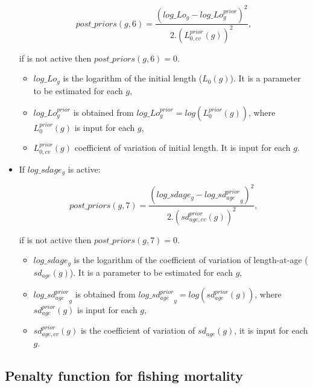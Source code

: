 \documentclass{article}
\begin{document}
\begin{itemize}
        \begin{equation}
            post\_priors(g,6) = \dfrac{(log\_Lo_g-log\_Lo^{prior}_{g})^2}{2.(L_{0,cv}^{prior}(g))^2},
        \end{equation}

        if is not active then $post\_priors(g,6)=0$.
        \begin{itemize}
            \item $log\_Lo_g$ is the logarithm of the initial length ($L_0(g)$). It is a parameter to be estimated for each $g$,
            
            \item $log\_Lo^{prior}_{g}$ is obtained from $log\_Lo^{prior}_{g}=log(L_0^{prior}(g))$, where $L_0^{prior}(g)$ is input for each $g$,
            
            \item $L_{0,cv}^{prior}(g)$ coefficient of variation of initial length. It is input for each $g$.
        \end{itemize}
        
        \item If $log\_sdage_g$ is active:
        
        \begin{equation}
            post\_priors(g,7) = \dfrac{(log\_sdage_g-{log\_sd^{prior}_{age}}_g)^2}{2.(sd_{age,cv}^{prior}(g))^2},
        \end{equation}

        if is not active then $post\_priors(g,7)=0.$
        
        \begin{itemize}
            \item $log\_sdage_g$ is the logarithm of the coefficient of variation of length-at-age ($sd_{age}(g)$). It is a parameter to be estimated for each $g$,
            
            \item ${log\_sd^{prior}_{age}}_g$ is obtained from ${log\_sd^{prior}_{age}}_g=log(sd_{age}^{prior}(g))$, where $sd_{age}^{prior}(g)$ is input for each $g$,
            
            \item $sd_{age,cv}^{prior}(g)$ is the coefficient of variation of $sd_{age}(g)$, it is input for each $g$.
        \end{itemize}
    \end{itemize}

\subsection{Penalty function for fishing mortality}
\end{document}
